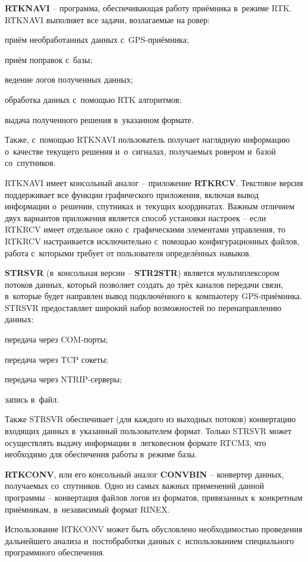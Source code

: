 \begin{dashitemize}
  \item \textbf{RTKNAVI} -- программа, обеспечивающая работу приёмника в~режиме RTK. RTKNAVI выполняет все задачи, возлагаемые на ровер:
  \begin{dashitemize}
    \item приём необработанных данных с~GPS-приёмника;
    \item приём поправок с~базы;
    \item ведение логов полученных данных;
    \item обработка данных с~помощью RTK алгоритмов;
    \item выдача полученного решения в~указанном формате.
  \end{dashitemize}

  Также, с~помощью RTKNAVI пользователь получает наглядную информацию о~качестве текущего решения и~о~сигналах, получаемых ровером и~базой со~спутников.
  
  RTKNAVI имеет консольный аналог -- приложение \textbf{RTKRCV}. Текстовое версия поддерживает все функции графического приложения, включая вывод информации о~решении, спутниках и~текущих координатах.
  Важным отличием двух вариантов приложения является способ установки настроек -- если RTKRCV имеет отдельное окно с~графическими элементами управления, то RTKRCV настраивается исключительно с~помощью конфигурационных файлов, работа с~которыми требует от пользователя определённых навыков.
  
  \item \textbf{STRSVR} (в~консольная версии -- \textbf{STR2STR}) является мультиплексором потоков данных, который позволяет создать до трёх каналов передачи связи, в~которые будет направлен вывод подключённого к~компьютеру GPS-приёмника.
  STRSVR предоставляет широкий набор возможностей по перенаправлению данных:
  
  \begin{dashitemize}
    \item передача через COM-порты;
    \item передача через TCP сокеты;
    \item передача через NTRIP-серверы;
    \item запись в~файл.
  \end{dashitemize}

  Также STRSVR обеспечивает (для каждого из выходных потоков) конвертацию входящих данных в~указанный пользователем формат. Только STRSVR может осуществлять выдачу информации в~легковесном формате RTCM3, что необходимо для обеспечения работы в~режиме базы.
  
  \item \textbf{RTKCONV}, или его консольный аналог \textbf{CONVBIN} -- конвертер данных, получаемых со~спутников. Одно из самых важных применений данной программы -- конвертация файлов логов из форматов, привязанных к~конкретным приёмникам, в~независимый формат RINEX.
  
  Использование RTKCONV может быть обусловлено необходимостью проведения дальнейшего анализа и~постобработки данных с~использованием специального программного обеспечения.
\end{dashitemize}

